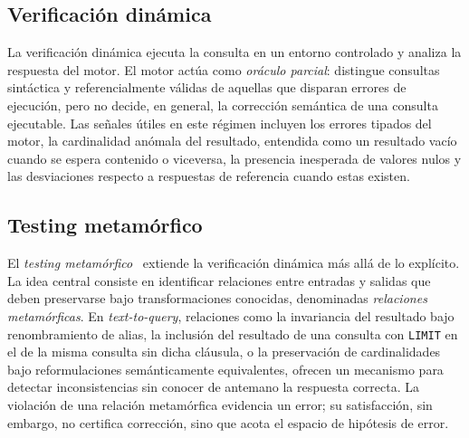 \subsection{Verificación dinámica}

La verificación dinámica ejecuta la consulta en un entorno controlado y analiza la respuesta del motor. El motor actúa como \emph{oráculo parcial}: distingue consultas sintáctica y referencialmente válidas de aquellas que disparan errores de ejecución, pero no decide, en general, la corrección semántica de una consulta ejecutable. Las señales útiles en este régimen incluyen los errores tipados del motor, la cardinalidad anómala del resultado, entendida como un resultado vacío cuando se espera contenido o viceversa, la presencia inesperada de valores nulos y las desviaciones respecto a respuestas de referencia cuando estas existen.

\subsection{Testing metamórfico}

El \emph{testing metamórfico}~\cite{ChenTY1998Metamorphic} extiende la verificación dinámica más allá de lo explícito. La idea central consiste en identificar relaciones entre entradas y salidas que deben preservarse bajo transformaciones conocidas, denominadas \emph{relaciones metamórficas}. En \emph{text-to-query}, relaciones como la invariancia del resultado bajo renombramiento de alias, la inclusión del resultado de una consulta con \texttt{LIMIT} en el de la misma consulta sin dicha cláusula, o la preservación de cardinalidades bajo reformulaciones semánticamente equivalentes, ofrecen un mecanismo para detectar inconsistencias sin conocer de antemano la respuesta correcta. La violación de una relación metamórfica evidencia un error; su satisfacción, sin embargo, no certifica corrección, sino que acota el espacio de hipótesis de error.
